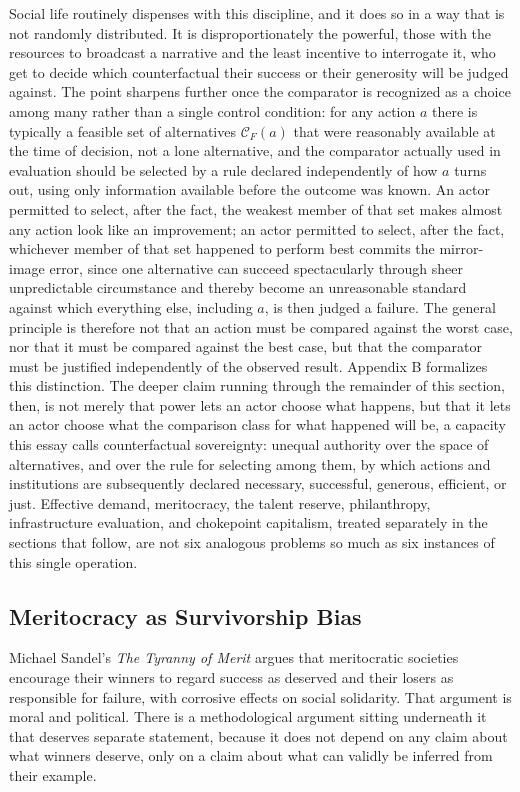 \documentclass[11pt]{article}
\begin{document}
Social life routinely dispenses with this discipline, and it does so in a way that is not randomly distributed. It is disproportionately the powerful, those with the resources to broadcast a narrative and the least incentive to interrogate it, who get to decide which counterfactual their success or their generosity will be judged against. The point sharpens further once the comparator is recognized as a choice among many rather than a single control condition: for any action $a$ there is typically a feasible set of alternatives $\mathcal{C}_F(a)$ that were reasonably available at the time of decision, not a lone alternative, and the comparator actually used in evaluation should be selected by a rule declared independently of how $a$ turns out, using only information available before the outcome was known. An actor permitted to select, after the fact, the weakest member of that set makes almost any action look like an improvement; an actor permitted to select, after the fact, whichever member of that set happened to perform best commits the mirror-image error, since one alternative can succeed spectacularly through sheer unpredictable circumstance and thereby become an unreasonable standard against which everything else, including $a$, is then judged a failure. The general principle is therefore not that an action must be compared against the worst case, nor that it must be compared against the best case, but that the comparator must be justified independently of the observed result. Appendix B formalizes this distinction. The deeper claim running through the remainder of this section, then, is not merely that power lets an actor choose what happens, but that it lets an actor choose what the comparison class for what happened will be, a capacity this essay calls counterfactual sovereignty: unequal authority over the space of alternatives, and over the rule for selecting among them, by which actions and institutions are subsequently declared necessary, successful, generous, efficient, or just. Effective demand, meritocracy, the talent reserve, philanthropy, infrastructure evaluation, and chokepoint capitalism, treated separately in the sections that follow, are not six analogous problems so much as six instances of this single operation.

\subsection{Meritocracy as Survivorship Bias}

Michael Sandel's \textit{The Tyranny of Merit} argues that meritocratic societies encourage their winners to regard success as deserved and their losers as responsible for failure, with corrosive effects on social solidarity. That argument is moral and political. There is a methodological argument sitting underneath it that deserves separate statement, because it does not depend on any claim about what winners deserve, only on a claim about what can validly be inferred from their example.
\end{document}
